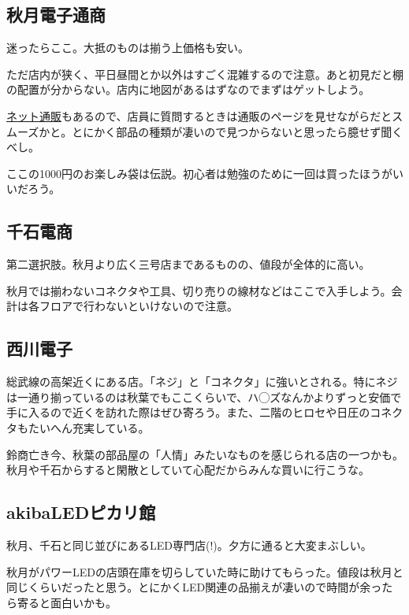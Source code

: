 \documentclass[letterpaper,10pt,dvipdfmx]{sphinxmanual}
\begin{document}
\subsection{秋月電子通商}
\label{\detokenize{buy_parts:}}\label{\detokenize{buy_parts:id6}}
迷ったらここ。大抵のものは揃う上価格も安い。

ただ店内が狭く、平日昼間とか以外はすごく混雑するので注意。あと初見だと棚の配置が分からない。店内に地図があるはずなのでまずはゲットしよう。

\href{http://akizukidenshi.com/}{ネット通販}もあるので、店員に質問するときは通販のページを見せながらだとスムーズかと。とにかく部品の種類が凄いので見つからないと思ったら臆せず聞くべし。

ここの1000円のお楽しみ袋は伝説。初心者は勉強のために一回は買ったほうがいいだろう。


\subsection{千石電商}
\label{\detokenize{buy_parts:}}\label{\detokenize{buy_parts:id7}}
第二選択肢。秋月より広く三号店まであるものの、値段が全体的に高い。

秋月では揃わないコネクタや工具、切り売りの線材などはここで入手しよう。会計は各フロアで行わないといけないので注意。


\subsection{西川電子}
\label{\detokenize{buy_parts:}}\label{\detokenize{buy_parts:id8}}
総武線の高架近くにある店。「ネジ」と「コネクタ」に強いとされる。特にネジは一通り揃っているのは秋葉でもここくらいで、ハ◯ズなんかよりずっと安価で手に入るので近くを訪れた際はぜひ寄ろう。また、二階のヒロセや日圧のコネクタもたいへん充実している。

鈴商亡き今、秋葉の部品屋の「人情」みたいなものを感じられる店の一つかも。秋月や千石からすると閑散としていて心配だからみんな買いに行こうな。


\subsection{akibaLEDピカリ館}
\label{\detokenize{buy_parts:akibaled}}
秋月、千石と同じ並びにあるLED専門店(!)。夕方に通ると大変まぶしい。

秋月がパワーLEDの店頭在庫を切らしていた時に助けてもらった。値段は秋月と同じくらいだったと思う。とにかくLED関連の品揃えが凄いので時間が余ったら寄ると面白いかも。
\end{document}

